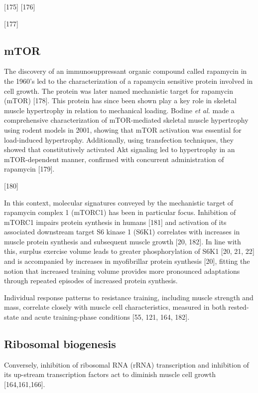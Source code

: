 \documentclass[twoside,10pt]{gihclass} %
\begin{document}
{[}175{]}
{[}176{]}

{[}177{]}

\hypertarget{mtor}{%
\subsection{mTOR}\label{mtor}}

The discovery of an immunosuppressant organic compound called rapamycin in the 1960's led to the characterization of a rapamycin sensitive protein involved in cell growth. The protein was later named mechanistic target for rapamycin (mTOR)
{[}178{]}. This protein has since been shown play a key role in skeletal muscle hypertrophy in relation to mechanical loading. Bodine \emph{et al.} made a comprehensive characterization of mTOR-mediated skeletal muscle hypertrophy using rodent models in 2001, showing that mTOR activation was essential for load-induced hypertrophy. Additionally, using transfection techniques, they showed that constitutively activated Akt signaling led to hypertrophy in an mTOR-dependent manner, confirmed with concurrent administration of rapamycin {[}179{]}.

{[}180{]}

In this context, molecular signatures conveyed by the mechanistic target of rapamycin complex 1 (mTORC1) has been in particular focus. Inhibition of mTORC1 impairs protein synthesis in humans {[}181{]} and activation of its associated downstream target S6 kinase 1 (S6K1) correlates with increases in muscle protein synthesis and subsequent muscle growth
{[}20, 182{]}.
In line with this, surplus {exercise} volume leads to greater phosphorylation of S6K1
{[}20, 21, 22{]} and {is accompanied by increases in }myofibrillar protein synthesis {[}20{]},
fitting the notion that increased training volume provides more pronounced adaptations{ through repeated episodes of increased protein synthesis}.

Individual response patterns to resistance training, including muscle strength and mass, correlate closely with muscle cell characteristics, measured in both rested-state and acute training-phase conditions
{[}55, 121, 164, 182{]}.

\hypertarget{ribosomal-biogenesis}{%
\subsection{Ribosomal biogenesis}\label{ribosomal-biogenesis}}

Conversely, inhibition of ribosomal RNA (rRNA) transcription and inhibition of its up-stream transcription factors act to diminish muscle cell growth
{[}164,161,166{]}.
\end{document}
